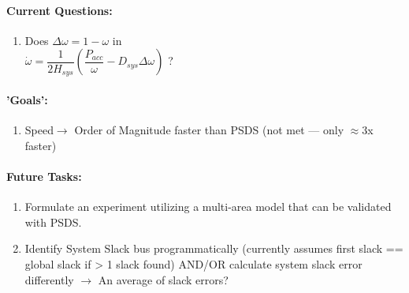 \documentclass[12pt]{article}
\begin{document}
\begin{multicols}{2}
	\paragraph{Current Questions:}
	\begin{enumerate}
	\item Does $\Delta \omega=1-\omega$ in \\ $\dot{\omega}=\dfrac{1}{2H_{sys}}\left(\dfrac{P_{acc}}{\omega} - D_{sys}\Delta \omega \right)$ ?
		


		
		
	\end{enumerate}
\paragraph{'Goals':}
	\begin{enumerate}
	\item Speed$\longrightarrow$ Order of Magnitude faster than PSDS (not met --- only $\approx$3x faster)
	\end{enumerate}

\vfill\null
\columnbreak

\paragraph{Future Tasks:} %
	\begin{enumerate}
		\item Formulate an experiment utilizing a multi-area model that can be validated with PSDS.
		\item Identify System Slack bus programmatically (currently assumes first slack == global slack if > 1 slack found)
		\subitem AND/OR calculate system slack error differently $\rightarrow$ An average of slack errors?


\end{enumerate}
\end{multicols}
\end{document}
